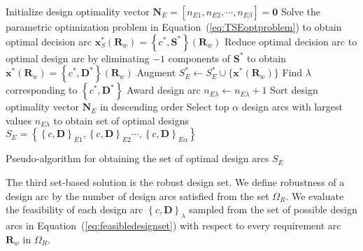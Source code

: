 \begin{algorithm}
	\DontPrintSemicolon %
	Initialize design optimality vector $\mathbf{N}_E = \left[n_{E1},n_{E2},\cdots,n_{E\beta}\right] = \mathbf{0}$\;	
	 {
		Solve the parametric optimization problem in Equation~(\ref{eq:TSEoptproblem}) to obtain optimal decision arc $\mathbf{x}_S^*(\mathbf{R}_w) = \left\{c^*,\mathbf{S}^*\right\}(\mathbf{R}_w)$\;
		Reduce optimal decision arc to optimal design arc by eliminating $-1$ components of $\mathbf{S}^*$ to obtain $\mathbf{x}^*(\mathbf{R}_w) = \left\{c^*,\mathbf{D}^*\right\}(\mathbf{R}_w)$\;
		Augment $S_{E}^* \gets S_{E}^* \cup \{ \mathbf{x}^*(\mathbf{R}_w) \} $\;
		Find $\lambda$ corresponding to $\left\{c^*,\mathbf{D}^*\right\}$\;
		Award design arc $n_{E\lambda} \gets n_{E\lambda} + 1$\;
	}
	Sort design optimality vector $\mathbf{N}_E$ in descending order\;
	Select top $\alpha$ design arcs with largest values $n_{E\lambda}$ to obtain set of optimal designs $S_E = \left\{\left\{c,\mathbf{D}\right\}_{E1},\left\{c,\mathbf{D}\right\}_{E2}\cdots,\left\{c,\mathbf{D}\right\}_{E\alpha}\right\}$\;
	\caption{Pseudo-algorithm for obtaining the set of optimal design arcs $S_{E}$}
	\label{algo:SBDOptalgo}
\end{algorithm}

The third set-based solution is the robust design set. We define robustness of a design arc by the number of design arcs satisfied from the set $\Omega_R$. We evaluate the feasibility of each design arc $\left\{c,\mathbf{D}\right\}_\lambda$ sampled from the set of possible design arcs in Equation~(\ref{eq:feasibledesignset}) with respect to every requirement arc $\mathbf{R}_w$ in $\Omega_R$.

